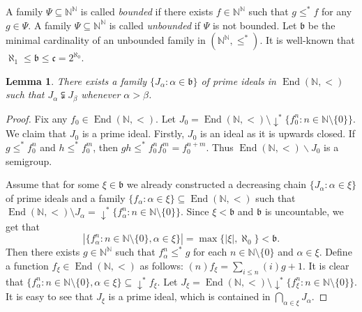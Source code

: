 \documentclass[11pt]{amsart}
\newtheorem{lemma}[theorem]{Lemma}
\theoremstyle{definition}
\newcommand{\N}{\mathbb N}
\newcommand{\E}{\operatorname{End}}
\newcommand{\End}{\operatorname{End}(\mathbb N, <)}
\begin{document}
 A family $\Psi\subseteq \N^\N$ is called {\em bounded} if there exists $f\in\N^\N$ such that $g\leq^* f$ for any $g\in \Psi$. A family $\Psi\subseteq \N^\N$ is called {\em unbounded} if $\Psi$ is not bounded. Let
 $\mathfrak b$ be the minimal cardinality of an unbounded family in $(\N^\N,\leq^*)$.
 It is well-known that $\aleph_1\leq \mathfrak b\leq \mathfrak c=2^{\aleph_0}$. 

\begin{lemma}\label{prop:big_ideal_chain}
There exists a family $\{J_{\alpha}:\alpha\in\mathfrak b\}$ of prime ideals in $\E(\N,<)$ such that \(J_\alpha \subsetneqq J_\beta\) whenever \(\alpha>\beta\).  
\end{lemma}

\begin{proof}
Fix any $f_0\in \End$. Let 
$J_0=\End\setminus {\downarrow}^* \{f_0^{n}:n\in\N\setminus\{0\}\}$. %
We claim that $J_0$ is a prime ideal. Firstly, \(J_0\) is an ideal as it is upwards closed. If \(g\leq^* f_0^n\) and \(h\leq^* f_0^m\), then \(gh\leq^* f_0^nf_0^m=f_0^{n+m}\). Thus \(\operatorname{End}(\N,<)\backslash J_0\) is a semigroup.


Assume that for some $\xi\in\mathfrak b$ we already constructed a decreasing chain $\{J_{\alpha}:\alpha\in\xi\}$ of prime ideals and a family $\{f_\alpha:\alpha\in\xi\}\subseteq \End$ such that $\End\setminus J_{\alpha}={\downarrow}^*\{f_\alpha^n:n\in\N\setminus\{0\}\}$. Since $\xi<\mathfrak b$ and $\mathfrak b$ is uncountable, we get that 
 $$|\{f^n_{\alpha}:n\in\N\setminus\{0\}, \alpha\in\xi\}|=\max\{|\xi|,\aleph_0\}<\mathfrak b.$$   Then there exists $g\in\N^\N$ such that $f_{\alpha}^n\leq^* g$ for each $n\in\N\setminus\{0\}$ and $\alpha\in\xi$. Define a function $f_{\xi}\in \End$ as follows: $(n)f_\xi=\sum_{i\leq n}(i)g+1$.  It is clear that 
 $\{f^n_{\alpha}:n\in\N\setminus\{0\}, \alpha\in\xi\}\subseteq {\downarrow}^*f_{\xi}$. Let $J_{\xi}=\End\setminus {\downarrow}^*\{f_{\xi}^n:n\in\N\setminus\{0\}\}$. It is easy to see that $J_{\xi}$ is a prime ideal, which is contained in $\bigcap_{\alpha\in\xi}J_{\alpha}$.
\end{proof}   
\end{document}
